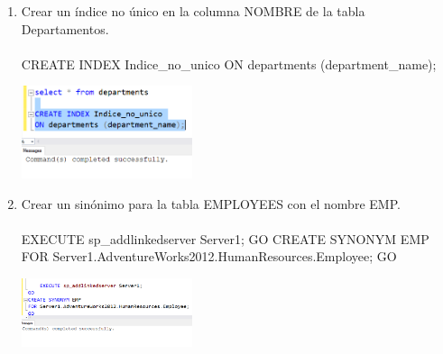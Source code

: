 \begin{enumerate}[1.]
	\item Crear un índice no único en la columna NOMBRE de la tabla Departamentos.
	\\ \\CREATE INDEX Indice\_no\_unico ON departments (department\_name);

	\begin{center}
	\includegraphics[width=5cm]{./Imagenes/actividad_03_07} 
	\end{center}	

	\item Crear un sinónimo para la tabla EMPLOYEES con el nombre EMP.
	\\ \\EXECUTE sp\_addlinkedserver Server1;  GO CREATE SYNONYM EMP FOR Server1.AdventureWorks2012.HumanResources.Employee; GO 	

	\begin{center}
	\includegraphics[width=5cm]{./Imagenes/actividad_03_08}  
	\end{center}	

\end{enumerate}

